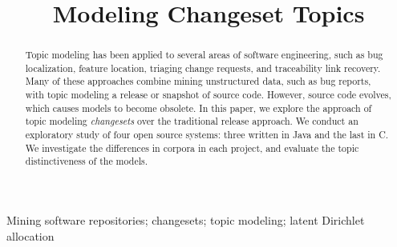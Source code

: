 \documentclass[conference]{IEEEtran}
\begin{document}
\title{Modeling Changeset Topics}
\author{

    \and


    \and

}


\maketitle

\begin{abstract}
Topic modeling has been applied to several areas of software engineering,
such as bug localization, feature location, triaging change requests,
and traceability link recovery.
Many of these approaches combine mining unstructured data, such as bug
reports, with topic modeling a release or snapshot of source code.
However, source code evolves, which causes models to become obsolete.
In this paper, we explore the approach of topic modeling \emph{changesets}
over the traditional release approach.
We conduct an exploratory study of four open source systems:
three written in Java and the last in C.
We investigate the differences in corpora in each project,
and evaluate the topic distinctiveness of the models.
\end{abstract}

\begin{IEEEkeywords}
Mining software repositories;
changesets;
topic modeling;
latent Dirichlet allocation
\end{IEEEkeywords}
\end{document}
